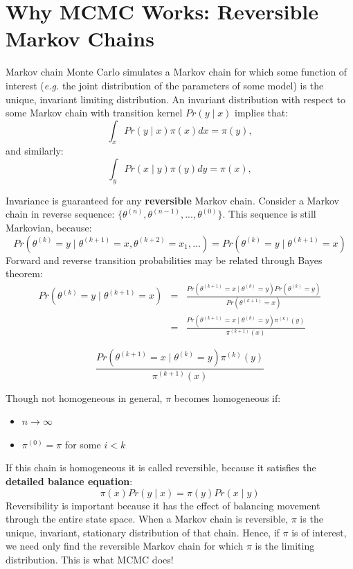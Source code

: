\documentclass[]{book}
\begin{document}
\section{Why MCMC Works: Reversible Markov Chains}

Markov chain Monte Carlo simulates a Markov chain for which some function of interest (\emph{e.g.} the joint distribution of the parameters of some model) is the unique, invariant limiting distribution. An invariant distribution with respect to some Markov chain with transition kernel $Pr(y \mid x)$ implies that:
\[
\int_x Pr(y \mid x) \pi(x) dx = \pi(y),
\]
and similarly:
\[
\int_y Pr(x \mid y) \pi(y) dy = \pi(x),
\]

Invariance is guaranteed for any \textbf{reversible} Markov chain. Consider a Markov chain in reverse sequence: $\{\theta^{(n)},\theta^{(n-1)},...,\theta^{(0)}\}$. This sequence is still Markovian, because:
\[
Pr(\theta^{(k)}=y \mid \theta^{(k+1)}=x,\theta^{(k+2)}=x_1,\ldots ) = Pr(\theta^{(k)}=y \mid \theta^{(k+1)}=x)
\]
Forward and reverse transition probabilities may be related through Bayes theorem:
\begin{eqnarray}
Pr(\theta^{(k)}=y \mid \theta^{(k+1)}=x) &=& \frac{Pr(\theta^{(k+1)}=x \mid \theta^{(k)}=y) Pr(\theta^{(k)}=y)}{Pr(\theta^{(k+1)}=x)} \nonumber \\
&=& \frac{Pr(\theta^{(k+1)}=x \mid \theta^{(k)}=y) \pi^{(k)}(y)}{\pi^{(k+1)}(x)} \nonumber
\end{eqnarray}

\[
\frac{Pr(\theta^{(k+1)}=x \mid \theta^{(k)}=y) \pi^{(k)}(y)}{\pi^{(k+1)}(x)}
\]

\noindent Though not homogeneous in general, $\pi$ becomes homogeneous if:
\begin{itemize}
\item $n \rightarrow \infty$
\item $\pi^{(0)}=\pi$ for some $i < k$
\end{itemize}

\noindent If this chain is homogeneous it is called reversible, because it satisfies the \textbf{detailed balance equation}:
\[
\pi(x)Pr(y \mid x) = \pi(y) Pr(x \mid y)
\]
Reversibility is important because it has the effect of balancing movement through the entire state space. When a Markov chain is reversible, $\pi$ is the unique, invariant, stationary distribution of that chain.
Hence, if $\pi$ is of interest, we need only find the reversible Markov chain for which $\pi$ is the limiting distribution. This is what MCMC does!
\end{document}
